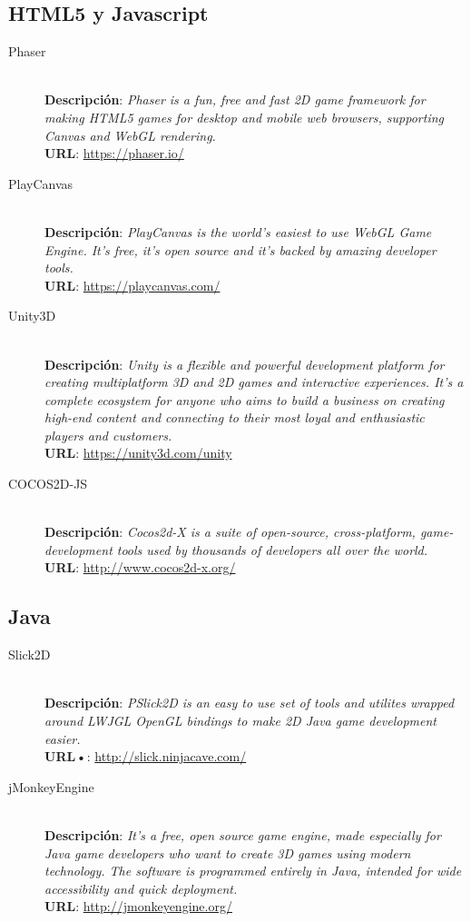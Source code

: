 \subsection{HTML5 y Javascript}
\begin{description}
\item[Phaser] \hfill \\
\textbf{Descripción}: \emph{Phaser is a fun, free and fast 2D game framework for making HTML5 games for desktop and mobile web browsers, supporting Canvas and WebGL rendering.} \\
\textbf{URL}: \url{https://phaser.io/}
\item[PlayCanvas] \hfill \\
\textbf{Descripción}: \emph{PlayCanvas is the world's easiest to use WebGL Game Engine. It's free, it's open source and it's backed by amazing developer tools.} \\
\textbf{URL}: \url{https://playcanvas.com/}
\item[Unity3D] \hfill \\
\textbf{Descripción}: \emph{Unity is a flexible and powerful development platform for creating multiplatform 3D and 2D games and interactive experiences. It's a complete ecosystem for anyone who aims to build a business on creating high-end content and connecting to their most loyal and enthusiastic players and customers.} \\
\textbf{URL}: \url{https://unity3d.com/unity}
\item[COCOS2D-JS] \hfill \\
\textbf{Descripción}: \emph{Cocos2d-X is a suite of open-source, cross-platform, game-development tools used by thousands of developers all over the world.} \\
\textbf{URL}: \url{http://www.cocos2d-x.org/}
\end{description}

\subsection{Java}
\begin{description}
\item[Slick2D] \hfill \\
\textbf{Descripción}: \emph{PSlick2D is an easy to use set of tools and utilites wrapped around LWJGL OpenGL bindings to make 2D Java game development easier.} \\
\textbf{URL\textbf{•}}: \url{http://slick.ninjacave.com/}
\item[jMonkeyEngine] \hfill \\
\textbf{Descripción}: \emph{It’s a free, open source game engine, made especially for Java game developers who want to create 3D games using modern technology. The software is programmed entirely in Java, intended for wide accessibility and quick deployment.} \\
\textbf{URL}: \url{http://jmonkeyengine.org/}
\end{description}

